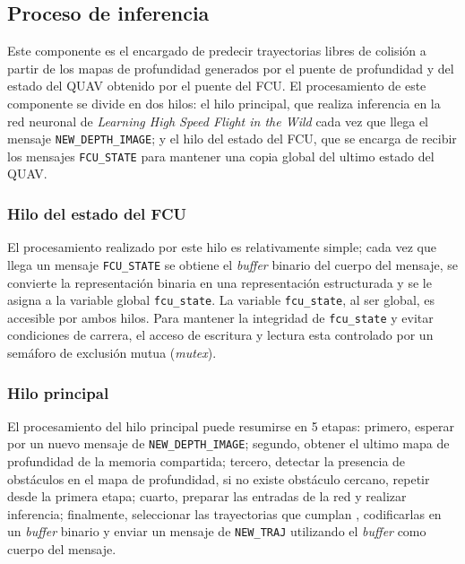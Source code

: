 \subsection{Proceso de inferencia}

Este componente es el encargado de predecir trayectorias libres de colisión a partir de los mapas de profundidad generados por el puente de profundidad y del estado del QUAV obtenido por el puente del FCU. El procesamiento de este componente se divide en dos hilos: el hilo principal, que realiza inferencia en la red neuronal de \textit{Learning High Speed Flight in the Wild} \cite{Loquercio2021} cada vez que llega el mensaje \texttt{NEW\_DEPTH\_IMAGE}; y el hilo del estado del FCU, que se encarga de recibir los mensajes \texttt{FCU\_STATE} para mantener una copia global del ultimo estado del QUAV.

\subsubsection{Hilo del estado del FCU}

El procesamiento realizado por este hilo es relativamente simple; cada vez que llega un mensaje \texttt{FCU\_STATE} se obtiene el \textit{buffer} binario del cuerpo del mensaje, se convierte la representación binaria en una representación estructurada y se le asigna a la variable global \texttt{fcu\_state}. La variable \texttt{fcu\_state}, al ser global, es accesible por ambos hilos. Para mantener la integridad de \texttt{fcu\_state} y evitar condiciones de carrera, el acceso de escritura y lectura esta controlado por un semáforo de exclusión mutua (\textit{mutex}).

\subsubsection{Hilo principal}

El procesamiento del hilo principal puede resumirse en 5 etapas: primero, esperar por un nuevo mensaje de \texttt{NEW\_DEPTH\_IMAGE}; segundo, obtener el ultimo mapa de profundidad de la memoria compartida; tercero, detectar la presencia de obstáculos en el mapa de profundidad, si no existe obstáculo cercano, repetir desde la primera etapa; cuarto, preparar las entradas de la red y realizar inferencia; finalmente, seleccionar las trayectorias que cumplan , codificarlas en un \textit{buffer} binario y enviar un mensaje de \texttt{NEW\_TRAJ} utilizando el \textit{buffer} como cuerpo del mensaje.

